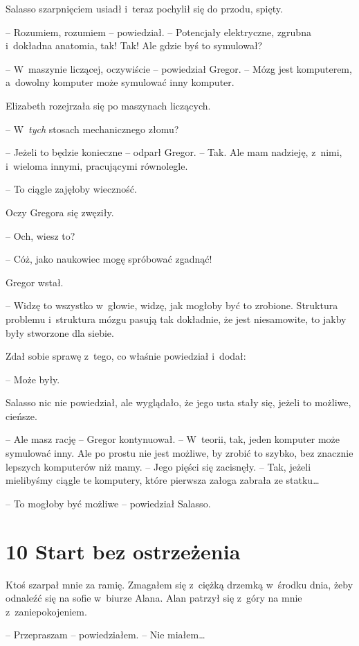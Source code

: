 \documentclass[oneside,polish,12pt,sfheadings]{mwbk}
\begin{document}
Salasso szarpnięciem usiadł i~teraz pochylił się do przodu, spięty.

-- Rozumiem, rozumiem -- powiedział. -- Potencjały elektryczne, zgrubna i~dokładna anatomia, tak! Tak! Ale gdzie byś to symulował?

-- W~maszynie liczącej, oczywiście -- powiedział Gregor. -- Mózg jest
komputerem, a~dowolny komputer może symulować inny komputer.

Elizabeth rozejrzała się po maszynach liczących.

-- W~\emph{tych} stosach mechanicznego złomu?

-- Jeżeli to będzie konieczne -- odparł Gregor. -- Tak. Ale mam nadzieję, z~nimi, i~wieloma innymi, pracującymi równolegle.

-- To ciągle zajęłoby wieczność.

Oczy Gregora się zwęziły. 

-- Och, wiesz to?

-- Cóż, jako naukowiec mogę spróbować zgadnąć!

Gregor wstał. 

-- Widzę to wszystko w~głowie, widzę, jak mogłoby być to
zrobione. Struktura problemu i~struktura mózgu pasują tak dokładnie, że
jest niesamowite, to jakby były stworzone dla siebie.

Zdał sobie sprawę z~tego, co właśnie powiedział i~dodał:

-- Może były.

Salasso nic nie powiedział, ale wyglądało, że jego usta stały się,
jeżeli to możliwe, cieńsze.

-- Ale masz rację -- Gregor kontynuował. -- W~teorii, tak, jeden komputer
może symulować inny. Ale po prostu nie jest możliwe, by zrobić to
szybko, bez znacznie lepszych komputerów niż mamy. -- Jego pięści się
zacisnęły. -- Tak, jeżeli mielibyśmy ciągle te komputery, które pierwsza
załoga zabrała ze statku\ldots

-- To mogłoby być możliwe -- powiedział Salasso.

\chapter[Start bez ostrzeżenia]{10 Start bez ostrzeżenia}


Ktoś szarpał mnie za ramię. Zmagałem się z~ciężką drzemką w~środku dnia,
żeby odnaleźć się na sofie w~biurze Alana. Alan patrzył się z~góry na
mnie z~zaniepokojeniem.

-- Przepraszam -- powiedziałem. -- Nie miałem\ldots
\end{document}
